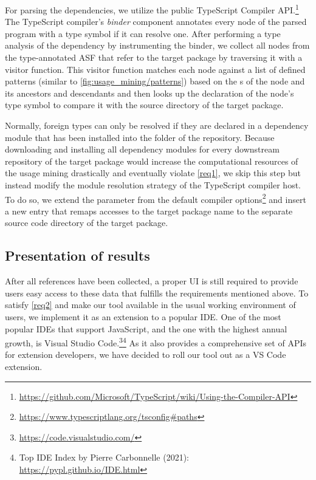 For parsing the dependencies, we utilize the public TypeScript Compiler API.\footnote{\url{https://github.com/Microsoft/TypeScript/wiki/Using-the-Compiler-API}}
The TypeScript compiler's \emph{binder} component annotates every node of the parsed program with a type symbol if it can resolve one.
After performing a type analysis of the dependency by instrumenting the binder, we collect all nodes from the type-annotated ASF that refer to the target package by traversing it with a visitor function.
This visitor function matches each node against a list of defined patterns (similar to \cref{fig:usage_mining/patterns}) based on the s of the node and its ancestors and descendants and then looks up the declaration of the node's type symbol to compare it with the source directory of the target package.

Normally, foreign types can only be resolved if they are declared in a dependency module that has been installed into the  folder of the repository.
Because downloading and installing all dependency modules for every downstream repository of the target package would increase the computational resources of the usage mining drastically and eventually violate \cref{req1}, we skip this step but instead modify the module resolution strategy of the TypeScript compiler host.
To do so, we extend the  parameter from the default compiler options\footnote{\url{https://www.typescriptlang.org/tsconfig\#paths}} and insert a new entry that remaps accesses to the target package name to the separate source code directory of the target package.

\subsection{Presentation of results}
\label{sec:implementation/presentation}

After all references have been collected, a proper UI is still required to provide users easy access to these data that fulfills the requirements mentioned above.
To satisfy \cref{req2} and make our tool available in the usual working environment of users, we implement it as an extension to a popular IDE.
One of the most popular IDEs that support JavaScript, and the one with the highest annual growth, is Visual Studio Code.\footnote{\url{https://code.visualstudio.com/}}\footnote{Top IDE Index by Pierre Carbonnelle (2021): \url{https://pypl.github.io/IDE.html}}
As it also provides a comprehensive set of APIs for extension developers, we have decided to roll our tool out as a VS Code extension.


